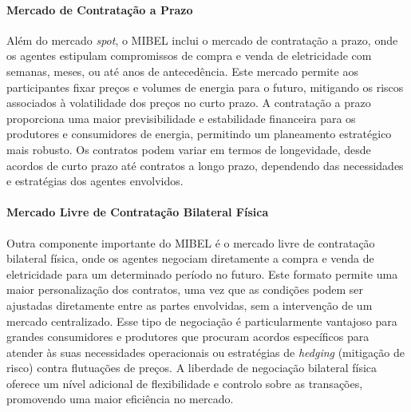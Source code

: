 \paragraph{Mercado de Contratação a Prazo \label{se:mercado_prazo}}
\text{ }  \par
Além do mercado \textit{spot}, o \gls{MIBEL} inclui o mercado de contratação a prazo, onde os agentes estipulam compromissos de compra e venda de eletricidade com semanas, meses, ou até anos de antecedência. Este mercado permite aos participantes fixar preços e volumes de energia para o futuro, mitigando os riscos associados à volatilidade dos preços no curto prazo. A contratação a prazo proporciona uma maior previsibilidade e estabilidade financeira para os produtores e consumidores de energia, permitindo um planeamento estratégico mais robusto. Os contratos podem variar em termos de longevidade, desde acordos de curto prazo até contratos a longo prazo, dependendo das necessidades e estratégias dos agentes envolvidos.\par


\paragraph{Mercado Livre de Contratação Bilateral Física \label{se:mercado_bilateral}}
\text{ }  \par
Outra componente importante do \gls{MIBEL} é o mercado livre de contratação bilateral física, onde os agentes negociam diretamente a compra e venda de eletricidade para um determinado período no futuro. Este formato permite uma maior personalização dos contratos, uma vez que as condições podem ser ajustadas diretamente entre as partes envolvidas, sem a intervenção de um mercado centralizado. Esse tipo de negociação é particularmente vantajoso para grandes consumidores e produtores que procuram acordos específicos para atender às suas necessidades operacionais ou estratégias de \textit{hedging} (mitigação de risco) contra flutuações de preços. A liberdade de negociação bilateral física oferece um nível adicional de flexibilidade e controlo sobre as transações, promovendo uma maior eficiência no mercado.\par

